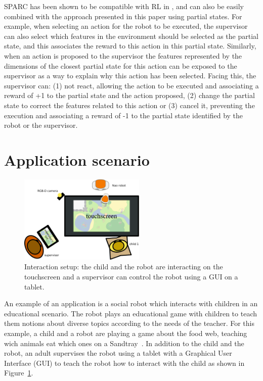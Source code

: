 \documentclass[letterpaper]{article} %
\begin{document}
SPARC has been shown to be compatible with RL in \cite{senft2017supervised},
and can also be easily combined with the approach presented in this paper using
partial states. For example, when selecting an action for the robot to be
executed, the supervisor can also select which features in the environment
should be selected as the partial state, and this associates the reward 
to this action in this partial state. Similarly, when an action is
proposed to the supervisor the features represented by the dimensions of the
closest partial state for this action can be exposed to the supervisor as a way to explain why
this action has been selected. Facing this, the supervisor can: (1) not react,
allowing the action to be executed and associating a reward of +1 to the partial
state and the action proposed, (2) change the partial state to correct the features
related to this action or (3) cancel it, preventing the execution and associating a
reward of -1 to the partial state identified by the robot or the supervisor. 

\section{Application scenario}

\begin{figure}
        \centering
  \includegraphics[width=60mm]{./figs/setup} 
    \caption{Interaction setup: the child and the robot are interacting on the
    touchscreen and a supervisor can control the robot using a GUI on a tablet.}
        \label{fig:setup}
\end{figure}


An example of an application is a social robot which interacts with children in an educational scenario.
The robot plays an educational game with children to teach them notions about
diverse topics according to the needs of the teacher. For this example, a child
and a robot are playing a game about the food web, teaching wich animals eat which
ones on a Sandtray~\cite{baxter2012touchscreen}. In addition to the child and
the robot, an adult supervises the robot using a tablet with a Graphical User
Interface (GUI) to teach the robot how to interact with the child as shown in
Figure~\ref{fig:setup}.
\end{document}
